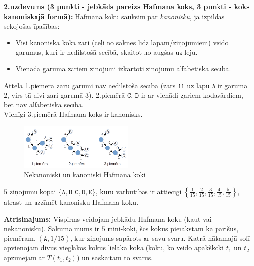\documentclass[11pt]{article}
\begin{document}
{\footnotesize
\vspace{6pt}
{\bf 2.uzdevums (3 punkti - jebkāds pareizs Hafmana koks, 3 punkti - koks kanoniskajā formā):}
Hafmana koku sauksim par {\em kanonisku}, ja izpildās sekojošas īpašības:
\begin{itemize}
\item Visi kanoniskā koka zari (ceļi no saknes līdz lapām/ziņojumiem) veido garumus, kuri ir nedilstošā secībā, skaitot no augšas uz leju.
\item Vienāda garuma zariem ziņojumi izkārtoti ziņojumu alfabētiskā secībā.
\end{itemize}
Attēla 1.piemērā zaru garumi nav nedilstošā secībā
(zars $\mathtt{11}$ uz lapu $\mathtt{A}$ ir garumā $2$, virs tā divi zari garumā $3$).
2.piemērā $\mathtt{C}$, $\mathtt{D}$ ir ar vienādi gariem kodavārdiem, bet nav alfabētiskā secībā.\\
Vienīgi 3.piemērā Hafmana koks ir kanonisks.


\begin{figure}[h!]
\begin{center}
\includegraphics[width=0.5\textwidth]{huffman-examples.png}
\caption{Nekanoniski un kanoniski Hafmana koki\label{fig:huffman-examples}}
\end{center}
\end{figure}

$5$ ziņojumu kopai $\{ \mathtt{A},\mathtt{B},\mathtt{C},\mathtt{D},\mathtt{E} \}$, kuru varbūtības ir attiecīgi
${\displaystyle \left\{ \frac{1}{15}, \frac{2}{15},\frac{3}{15},\frac{4}{15},\frac{5}{15} \right\}}$,
atrast un uzzīmēt kanonisku Hafmana koku.
}

\vspace{6pt}
{\bf Atrisinājums:} Vispirms veidojam jebkādu Hafmana koku (kaut vai nekanonisku).
Sākumā mums ir $5$ mini-koki, šos kokus pierakstām kā pārīšus, piemēram,
$(\mathtt{A},1/15)$, kur ziņojums sapārots ar savu svaru.
Katrā nākamajā solī apvienojam divus vieglākos kokus lielākā kokā (koku, ko veido
apakškoki $t_1$ un $t_2$ apzīmējam ar $T(t_1,t_2)$) un saskaitām to svarus.
\end{document}
